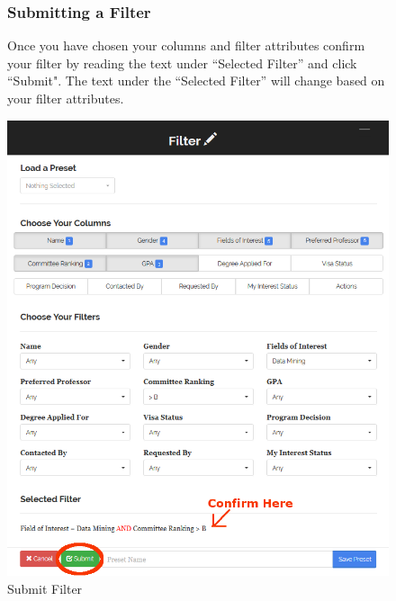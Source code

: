 \documentclass[fontsize=12pt,paper=letter,twoside]{scrartcl}
\begin{document}
\clearpage 
\begin{figure}[!htb]
\subsubsection{Submitting a Filter}
Once you have chosen your columns and filter attributes confirm your filter by reading the text under ``Selected Filter'' and click ``Submit". The text under the ``Selected Filter'' will change based on your filter attributes.
\begin{center}
\includegraphics[width=.99\textwidth]{images/submit_filter.png}
\end{center}
\caption{Submit Filter}
\label{fig:submit_filter}
\end{figure}
\end{document}
